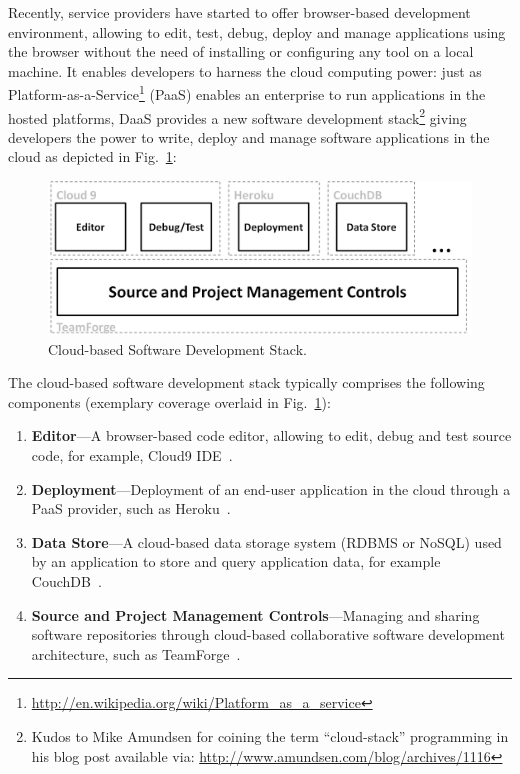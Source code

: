 \documentclass[11pt,fleqn,twoside]{article}
\begin{document}
Recently, service providers have started to offer browser-based development environment, allowing to edit, test, debug, deploy and manage applications using the browser without the need of installing or configuring any tool on a local machine. It enables developers to harness the cloud computing power: just as Platform-as-a-Service\footnote{\url{http://en.wikipedia.org/wiki/Platform_as_a_service}} (PaaS) enables an enterprise to run applications in the hosted platforms, DaaS provides a new software development stack\footnote{Kudos to Mike Amundsen for coining the term ``cloud-stack'' programming in his blog post available via: \url{http://www.amundsen.com/blog/archives/1116}} giving developers the power to write, deploy and manage software applications in the cloud as depicted in Fig.~\ref{fig:DevStack}:

\begin{figure}[h]
\begin{center}
\includegraphics[width=0.8\columnwidth]{fig/CloudDevStack}
\end{center}
\vspace*{-4ex}
\caption{Cloud-based Software Development Stack.}
\label{fig:DevStack}
\end{figure}

The cloud-based software development stack typically comprises the following components (exemplary coverage overlaid in  Fig.~\ref{fig:DevStack}):

\begin{enumerate}
    \item \textbf{Editor}---A browser-based code editor, allowing to edit, debug and test source code, for example, Cloud9 IDE~\cite{cloud9IDE_url}.
    \item \textbf{Deployment}---Deployment of an end-user application in the cloud through a PaaS provider, such as Heroku~\cite{Heroku_url}.
    \item \textbf{Data Store}---A cloud-based data storage system (RDBMS or NoSQL) used by an application to store and query application data, for example CouchDB~\cite{couchdb_url}.
    \item \textbf{Source and Project Management Controls}---Managing and sharing software repositories through cloud-based collaborative software development architecture, such as TeamForge~\cite{teamforge_url}.
\end{enumerate}
\end{document}
